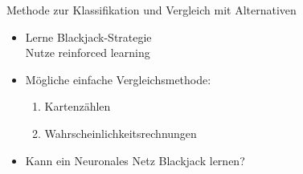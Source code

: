 \documentclass[aspectratio=1610, 9pt]{beamer}
\begin{document}
\begin{frame}{Methode zur Klassifikation und Vergleich mit Alternativen}
  \begin{itemize}
    \item Lerne Blackjack-Strategie \\
    \rightarrow{} Nutze reinforced learning\\
    \item Mögliche einfache Vergleichsmethode:
    \begin{enumerate}
      \item Kartenzählen
      \item Wahrscheinlichkeitsrechnungen
    \end{enumerate}
    \item Kann ein Neuronales Netz Blackjack lernen?
  \end{itemize}
\end{frame}
\end{document}

